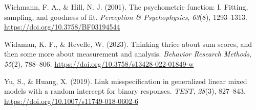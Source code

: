 \documentclass[
  man,
  longtable,
  nolmodern,
  notxfonts,
  notimes,
  colorlinks=true,linkcolor=blue,citecolor=blue,urlcolor=blue]{apa7}
\newlength{\cslhangindent}
\newenvironment{CSLReferences}[2] %
 {\begin{list}{}{%
  \setlength{\itemindent}{0pt}
  \setlength{\leftmargin}{0pt}
  \setlength{\parsep}{0pt}
  \ifodd #1
   \setlength{\leftmargin}{\cslhangindent}
   \setlength{\itemindent}{-1\cslhangindent}
  \fi
  \setlength{\itemsep}{#2\baselineskip}}}
 {\end{list}}
\begin{document}
\begin{CSLReferences}{1}{0}
Wichmann, F. A., \& Hill, N. J. (2001). The psychometric function: I.
Fitting, sampling, and goodness of fit. \emph{Perception \&
Psychophysics}, \emph{63}(8), 1293--1313.
\url{https://doi.org/10.3758/BF03194544}

Widaman, K. F., \& Revelle, W. (2023). Thinking thrice about sum scores,
and then some more about measurement and analysis. \emph{Behavior
Research Methods}, \emph{55}(2), 788--806.
\url{https://doi.org/10.3758/s13428-022-01849-w}

Yu, S., \& Huang, X. (2019). Link misspecification in generalized linear
mixed models with a random intercept for binary responses. \emph{TEST},
\emph{28}(3), 827--843. \url{https://doi.org/10.1007/s11749-018-0602-6}

\end{CSLReferences}
\end{document}
